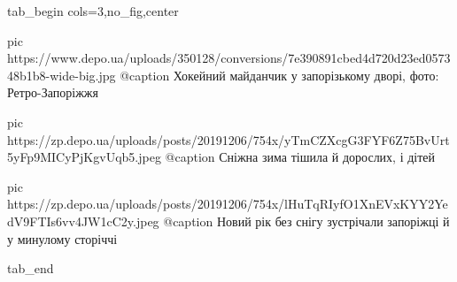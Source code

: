  
 
 
 
 


\ifcmt
  tab_begin cols=3,no_fig,center

     pic https://www.depo.ua/uploads/350128/conversions/7e390891cbed4d720d23ed057348b1b8-wide-big.jpg
		 @caption Хокейний майданчик у запорізькому дворі, фото: Ретро-Запоріжжя 

		 pic https://zp.depo.ua/uploads/posts/20191206/754x/yTmCZXcgG3FYF6Z75BvUrt5yFp9MICyPjKgvUqb5.jpeg
		 @caption Сніжна зима тішила й дорослих, і дітей 

		 pic https://zp.depo.ua/uploads/posts/20191206/754x/lHuTqRIyfO1XnEVxKYY2YedV9FTIs6vv4JW1cC2y.jpeg
		 @caption Новий рік без снігу зустрічали запоріжці й у минулому сторіччі

  tab_end
\fi
